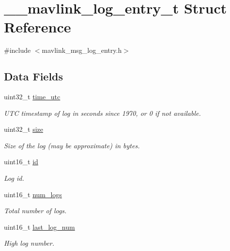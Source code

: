 \hypertarget{struct____mavlink__log__entry__t}{\section{\+\_\+\+\_\+mavlink\+\_\+log\+\_\+entry\+\_\+t Struct Reference}
\label{struct____mavlink__log__entry__t}
}


{\ttfamily \#include $<$mavlink\+\_\+msg\+\_\+log\+\_\+entry.\+h$>$}

\subsection*{Data Fields}
\begin{DoxyCompactItemize}
\item 
uint32\+\_\+t \hyperlink{struct____mavlink__log__entry__t_a88e5b3a71ebc3ee9da62331929dc50bc}{time\+\_\+utc}
\begin{DoxyCompactList}\small\item\em U\+T\+C timestamp of log in seconds since 1970, or 0 if not available. \end{DoxyCompactList}\item 
uint32\+\_\+t \hyperlink{struct____mavlink__log__entry__t_a5086cc006c4c5e8a6a0706635b6e4204}{size}
\begin{DoxyCompactList}\small\item\em Size of the log (may be approximate) in bytes. \end{DoxyCompactList}\item 
uint16\+\_\+t \hyperlink{struct____mavlink__log__entry__t_a59a5f04a6bba67c6dabf509d9822a623}{id}
\begin{DoxyCompactList}\small\item\em Log id. \end{DoxyCompactList}\item 
uint16\+\_\+t \hyperlink{struct____mavlink__log__entry__t_a6b27aca7e938d8db84eac6f10aebd679}{num\+\_\+logs}
\begin{DoxyCompactList}\small\item\em Total number of logs. \end{DoxyCompactList}\item 
uint16\+\_\+t \hyperlink{struct____mavlink__log__entry__t_a11af2e1637583c1956d105e6694849d1}{last\+\_\+log\+\_\+num}
\begin{DoxyCompactList}\small\item\em High log number. \end{DoxyCompactList}\end{DoxyCompactItemize}


